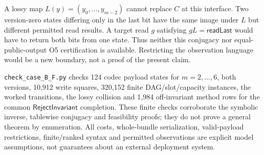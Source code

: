 A lossy map $L(y)=(y_0,\ldots,y_{m-2})$ cannot replace $C$ at this
interface. Two version-zero states differing only in the last bit have
the same image under $L$ but different permitted read results. A target
read $g$ satisfying $gL=\mathsf{readLast}$ would have to return both
bits from one state. Thus neither this conjugacy nor equal-public-output
O5 certification is available. Restricting the observation language
would be a new boundary, not a proof of the present claim.

\texttt{check\_case\_B\_F.py} checks 124 codec payload states for
$m=2,\ldots,6$, both versions, 10,912 write squares, 320,152 finite
DAG/slot/capacity instances, the worked transitions, the lossy collision and 1,984 off-invariant
method rows for the common $\mathsf{RejectInvariant}$ completion.
These finite checks corroborate the symbolic inverse, tablewise
conjugacy and feasibility proofs; they do not prove a general theorem
by enumeration. All costs, whole-bundle serialization, valid-payload
restrictions, finite/ranked syntax and permitted observations are explicit
model assumptions, not guarantees about an external deployment system.

